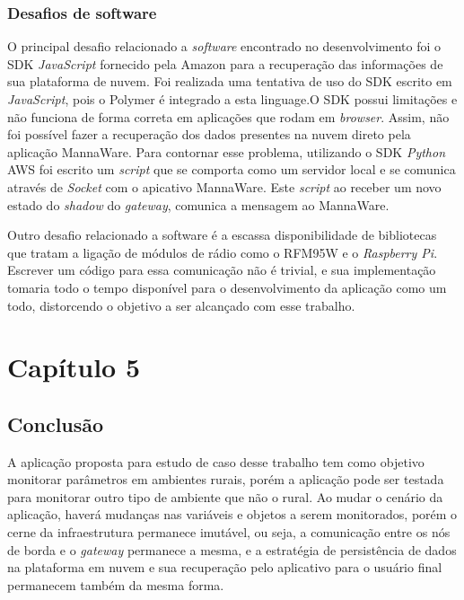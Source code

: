 \documentclass[
    hidelinks,
	12pt,				%
	openany,
	oneside, 
	a4paper,			%
	english,			%
	french,				%
	spanish,			%
	brazil				%
	]{abntex2}
\begin{document}
\subsection{Desafios de software}

O principal desafio relacionado a \textit{software} encontrado no desenvolvimento foi o SDK \textit{JavaScript} fornecido pela Amazon para a recuperação das informações de sua plataforma de nuvem. Foi realizada uma tentativa de uso do SDK escrito em \textit{JavaScript}, pois o Polymer é integrado a esta linguage.O SDK possui limitações e não funciona de forma correta em aplicações que rodam em \textit{browser}. Assim, não foi possível fazer a recuperação dos dados presentes na nuvem direto pela aplicação MannaWare. Para contornar esse problema, utilizando o SDK \textit{Python} AWS foi escrito um \textit{script} que se comporta como um servidor local e se comunica através de \textit{Socket} com o apicativo MannaWare. Este \textit{script} ao receber um novo estado do \textit{shadow} do \textit{gateway}, comunica a mensagem ao MannaWare.

Outro desafio relacionado a software é a escassa disponibilidade de bibliotecas que tratam a ligação de módulos de rádio como o RFM95W e o \textit{Raspberry Pi}. Escrever um código para essa comunicação não é trivial, e sua implementação tomaria todo o tempo disponível para o desenvolvimento da aplicação como um todo, distorcendo o objetivo a ser alcançado com esse trabalho.


\setcounter{section}{0}
\chapter*[Capítulo 5]{Capítulo 5} \label{capitulo5}
\section{Conclusão}

A aplicação proposta para estudo de caso desse trabalho tem como objetivo monitorar parâmetros em ambientes rurais, porém a aplicação pode ser testada para monitorar outro tipo de ambiente que não o rural. Ao mudar o cenário da aplicação, haverá mudanças nas variáveis e objetos a serem monitorados, porém o cerne da infraestrutura permanece imutável, ou seja, a comunicação entre os nós de borda e o \textit{gateway} permanece a mesma, e a estratégia de persistência de dados na plataforma em nuvem e sua recuperação pelo aplicativo para o usuário final permanecem também da mesma forma. 
\end{document}
